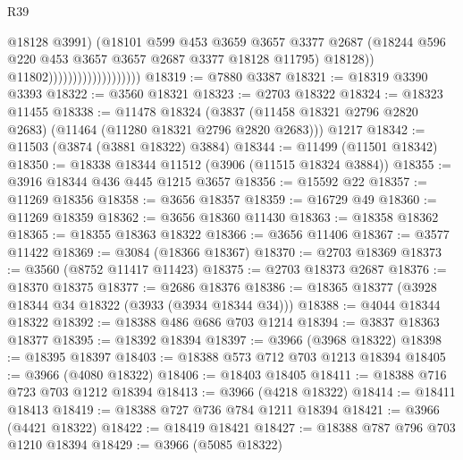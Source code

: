 \begin{lexlean}{R39}
\begin{coremodule}
                                              @18128
                                              @3991)
                                            (@18101
                                              @599
                                              @453
                                              @3659
                                              @3657
                                              @3377
                                              @2687
                                              (@18244
                                                @596
                                                @220
                                                @453
                                                @3657
                                                @3657
                                                @2687
                                                @3377
                                                @18128
                                                @11795)
                                              @18128))
                                          @11802)))))))))))))))))))
@18319 := @7880 @3387
@18321 := @18319 @3390 @3393
@18322 := @3560 @18321
@18323 := @2703 @18322
@18324 := @18323 @11455
@18338 := @11478
    @18324
    (@3837 (@11458 @18321 @2796 @2820 @2683) (@11464 (@11280 @18321 @2796 @2820 @2683)))
    @1217
@18342 := @11503 (@3874 (@3881 @18322) @3884)
@18344 := @11499 (@11501 @18342)
@18350 := @18338 @18344 @11512 (@3906 (@11515 @18324 @3884))
@18355 := @3916 @18344 @436 @445 @1215 @3657
@18356 := @15592 @22
@18357 := @11269 @18356
@18358 := @3656 @18357
@18359 := @16729 @49
@18360 := @11269 @18359
@18362 := @3656 @18360 @11430
@18363 := @18358 @18362
@18365 := @18355 @18363 @18322
@18366 := @3656 @11406
@18367 := @3577 @11422
@18369 := @3084 (@18366 @18367)
@18370 := @2703 @18369
@18373 := @3560 (@8752 @11417 @11423)
@18375 := @2703 @18373 @2687
@18376 := @18370 @18375
@18377 := @2686 @18376
@18386 := @18365 @18377 (@3928 @18344 @34 @18322 (@3933 (@3934 @18344 @34)))
@18388 := @4044 @18344 @18322
@18392 := @18388 @486 @686 @703 @1214
@18394 := @3837 @18363 @18377
@18395 := @18392 @18394
@18397 := @3966 (@3968 @18322)
@18398 := @18395 @18397
@18403 := @18388 @573 @712 @703 @1213 @18394
@18405 := @3966 (@4080 @18322)
@18406 := @18403 @18405
@18411 := @18388 @716 @723 @703 @1212 @18394
@18413 := @3966 (@4218 @18322)
@18414 := @18411 @18413
@18419 := @18388 @727 @736 @784 @1211 @18394
@18421 := @3966 (@4421 @18322)
@18422 := @18419 @18421
@18427 := @18388 @787 @796 @703 @1210 @18394
@18429 := @3966 (@5085 @18322)

\end{coremodule}
\end{lexlean}
